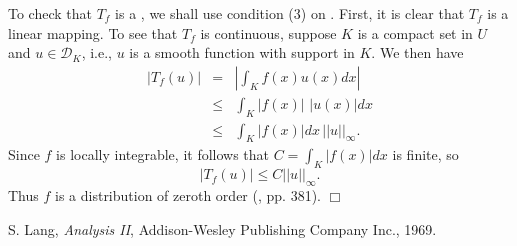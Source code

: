 \documentclass[12pt]{article}
\begin{document}
\newcommand{\cD}[0]{\mathcal{D}}

To check that $T_f$ is a ,
we shall use
condition (3) on .
First, it is clear that $T_f$ is a linear mapping.
To see that $T_f$ is continuous, suppose $K$ is a compact set in
$U$ and $u\in \cD_K$, i.e., $u$ is a smooth function with support in $K$.
We then have
\begin{eqnarray*}
|T_f(u)| &=& |\int_K f(x) u(x) dx |\\
   &\le& \int_K |f(x)| \,\, |u(x)| dx \\
   &\le& \int_K |f(x)| dx \, ||u||_\infty.
\end{eqnarray*}
Since $f$ is locally integrable, it follows that $C=\int_K |f(x)| dx$
is finite, so
$$ |T_f(u)| \le C ||u||_\infty.$$
Thus $f$ is a distribution of zeroth order (\cite{lang}, pp. 381). $\Box$

\begin{thebibliography}{9}
 S. Lang, \emph{Analysis II},
 Addison-Wesley Publishing Company Inc., 1969.
 \end{thebibliography}
\end{document}
